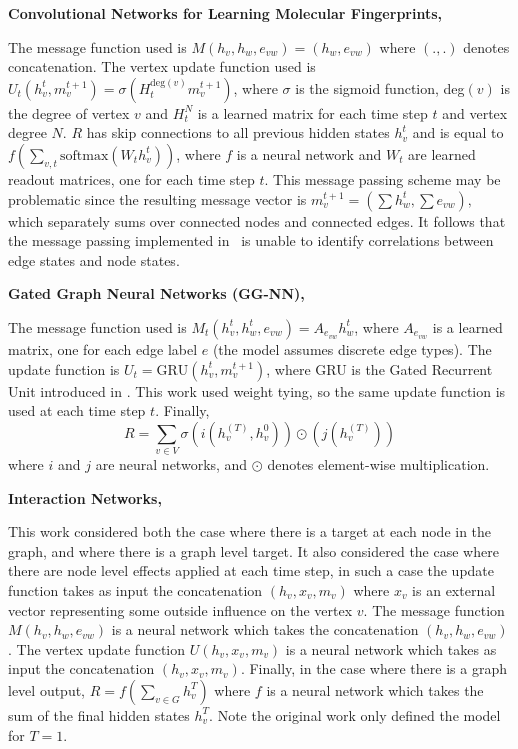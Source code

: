 \documentclass{article}
\begin{document}
\textbf{Convolutional Networks for Learning Molecular Fingerprints, \citet{duvenaud2015}}

The message function used is $M(h_v, h_w, e_{vw}) = (h_w, e_{vw})$ where $(.,.)$ denotes concatenation. The vertex update function used is $U_t(h_v^t, m_v^{t+1}) = \sigma(H_t^{\textrm{deg}(v)} m_v^{t+1})$, where $\sigma$ is the sigmoid function, deg$(v)$ is the degree of vertex $v$ and $H_t^N$ is a learned matrix for each time step $t$ and vertex degree $N$. $R$ has skip connections to all previous hidden states $h_v^t$ and is equal to $f \left( \sum\limits_{v, t} \textrm{softmax}( W_t h_v^t) \right)$, where $f$ is a neural network and $W_t$ are learned readout matrices, one for each time step $t$. This message passing scheme may be problematic since the resulting message vector is $m_v^{t+1} = \left( \sum h_w^t, \sum e_{vw} \right),$
which separately sums over connected nodes and connected edges. It follows that the message passing implemented in~\citet{duvenaud2015} is unable to identify correlations between edge states and node states.

\textbf{Gated Graph Neural Networks (GG-NN), \citet{yujia}}

The message function used is $M_t(h_v^t, h_w^t, e_{vw}) = A_{e_{vw}} h_w^t$, where $A_{e_{vw}}$ is a learned matrix, one for each edge label $e$ (the model assumes discrete edge types). The update function is $U_t = \textrm{GRU}(h_v^t, m_v^{t+1})$, where GRU is the Gated Recurrent Unit introduced in \citet{cho2014properties}. This work used weight tying, so the same update function is used at each time step $t$. Finally, 
\begin{equation} \label{eq:graph_level}
R =  \sum\limits_{v \in V} \sigma \left( i(h_v^{(T)}, h_v^0) \right) \odot \left( j(h_v^{(T)}) \right)
\end{equation}
  where $i$ and $j$ are neural networks, and $\odot$ denotes element-wise multiplication. 

\textbf{Interaction Networks, \citet{battaglia2016interaction}}

  This work considered both the case where there is a target at each node in the graph, and where there is a graph level target. It also considered the case where there are node level effects applied at each time step, in such a case the update function takes as input the concatenation $(h_v, x_v, m_v)$ where $x_v$ is an external vector representing some outside influence on the vertex $v$. 
  The message function $M(h_v, h_w, e_{vw})$ is a neural network which takes the concatenation $(h_v, h_w, e_{vw})$. The vertex update function $U(h_v,x_v, m_v)$ is a neural network which takes as input the concatenation $(h_v, x_v, m_v)$. Finally, in the case where there is a graph level output,  $R = f(\sum\limits_{v \in G} h_v^T)$ where $f$ is a neural network which takes the sum of the final hidden states $h_v^T$. Note the original work only defined the model for $T=1$.
\end{document}
